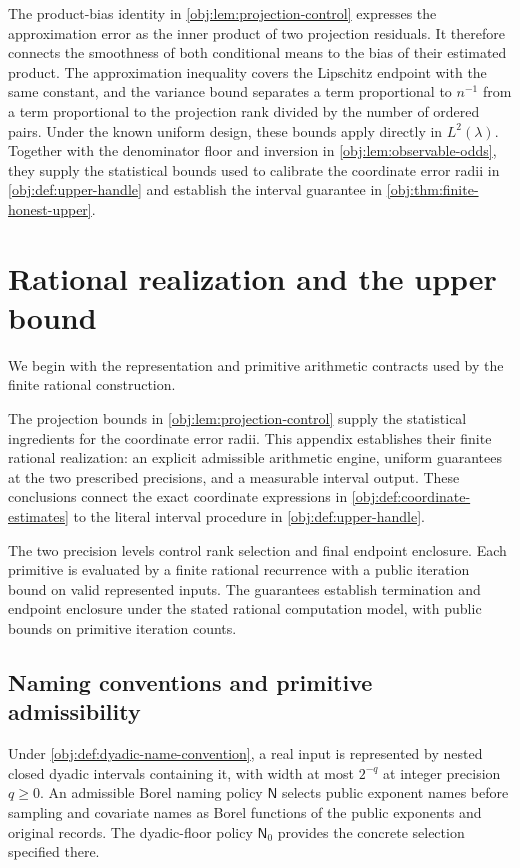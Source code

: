\documentclass[11pt]{article}
\begin{document}
The product-bias identity in \cref{obj:lem:projection-control} expresses the approximation error as the inner product of two projection residuals. It therefore connects the smoothness of both conditional means to the bias of their estimated product. The approximation inequality covers the Lipschitz endpoint with the same constant, and the variance bound separates a term proportional to \(n^{-1}\) from a term proportional to the projection rank divided by the number of ordered pairs. Under the known uniform design, these bounds apply directly in \(L^2(\lambda)\). Together with the denominator floor and inversion in \cref{obj:lem:observable-odds}, they supply the statistical bounds used to calibrate the coordinate error radii in \cref{obj:def:upper-handle} and establish the interval guarantee in \cref{obj:thm:finite-honest-upper}.


\section{Rational realization and the upper bound}
\label{sec:rational-realization}

We begin with the representation and primitive arithmetic contracts used by the finite rational construction.

The projection bounds in \cref{obj:lem:projection-control} supply the statistical ingredients for the coordinate error radii. This appendix establishes their finite rational realization: an explicit admissible arithmetic engine, uniform guarantees at the two prescribed precisions, and a measurable interval output. These conclusions connect the exact coordinate expressions in \cref{obj:def:coordinate-estimates} to the literal interval procedure in \cref{obj:def:upper-handle}.

The two precision levels control rank selection and final endpoint enclosure. Each primitive is evaluated by a finite rational recurrence with a public iteration bound on valid represented inputs. The guarantees establish termination and endpoint enclosure under the stated rational computation model, with public bounds on primitive iteration counts.

\subsection{Naming conventions and primitive admissibility}

Under \cref{obj:def:dyadic-name-convention}, a real input is represented by nested closed dyadic intervals containing it, with width at most \(2^{-q}\) at integer precision \(q\ge0\). An admissible Borel naming policy \(\mathsf N\) selects public exponent names before sampling and covariate names as Borel functions of the public exponents and original records. The dyadic-floor policy \(\mathsf N_0\) provides the concrete selection specified there.
\end{document}
